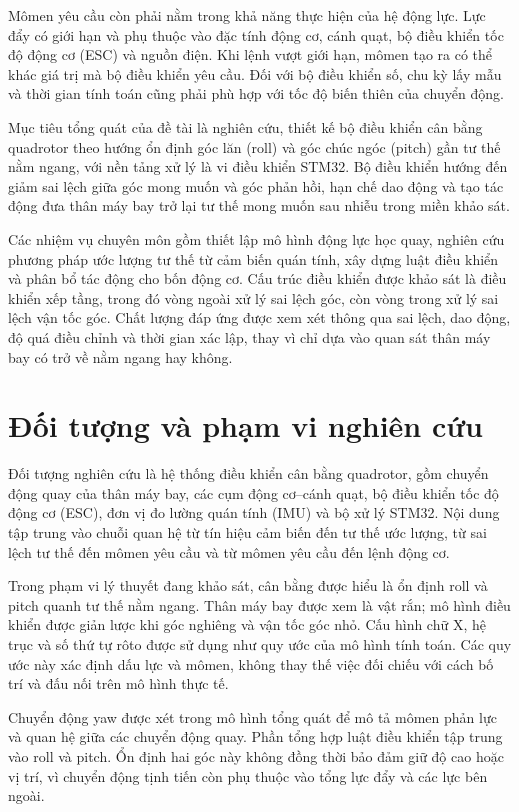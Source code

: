 Mômen yêu cầu còn phải nằm trong khả năng thực hiện của hệ động lực. Lực đẩy có giới hạn và phụ thuộc vào đặc tính động cơ, cánh quạt, bộ điều khiển tốc độ động cơ (ESC) và nguồn điện. Khi lệnh vượt giới hạn, mômen tạo ra có thể khác giá trị mà bộ điều khiển yêu cầu. Đối với bộ điều khiển số, chu kỳ lấy mẫu và thời gian tính toán cũng phải phù hợp với tốc độ biến thiên của chuyển động.

Mục tiêu tổng quát của đề tài là nghiên cứu, thiết kế bộ điều khiển cân bằng quadrotor theo hướng ổn định góc lăn (roll) và góc chúc ngóc (pitch) gần tư thế nằm ngang, với nền tảng xử lý là vi điều khiển STM32. Bộ điều khiển hướng đến giảm sai lệch giữa góc mong muốn và góc phản hồi, hạn chế dao động và tạo tác động đưa thân máy bay trở lại tư thế mong muốn sau nhiễu trong miền khảo sát.

Các nhiệm vụ chuyên môn gồm thiết lập mô hình động lực học quay, nghiên cứu phương pháp ước lượng tư thế từ cảm biến quán tính, xây dựng luật điều khiển và phân bổ tác động cho bốn động cơ. Cấu trúc điều khiển được khảo sát là điều khiển xếp tầng, trong đó vòng ngoài xử lý sai lệch góc, còn vòng trong xử lý sai lệch vận tốc góc. Chất lượng đáp ứng được xem xét thông qua sai lệch, dao động, độ quá điều chỉnh và thời gian xác lập, thay vì chỉ dựa vào quan sát thân máy bay có trở về nằm ngang hay không.

\section{Đối tượng và phạm vi nghiên cứu}
\label{sec:introduction-scope}

Đối tượng nghiên cứu là hệ thống điều khiển cân bằng quadrotor, gồm chuyển động quay của thân máy bay, các cụm động cơ--cánh quạt, bộ điều khiển tốc độ động cơ (ESC), đơn vị đo lường quán tính (IMU) và bộ xử lý STM32. Nội dung tập trung vào chuỗi quan hệ từ tín hiệu cảm biến đến tư thế ước lượng, từ sai lệch tư thế đến mômen yêu cầu và từ mômen yêu cầu đến lệnh động cơ.

Trong phạm vi lý thuyết đang khảo sát, cân bằng được hiểu là ổn định roll và pitch quanh tư thế nằm ngang. Thân máy bay được xem là vật rắn; mô hình điều khiển được giản lược khi góc nghiêng và vận tốc góc nhỏ. Cấu hình chữ X, hệ trục và số thứ tự rôto được sử dụng như quy ước của mô hình tính toán. Các quy ước này xác định dấu lực và mômen, không thay thế việc đối chiếu với cách bố trí và đấu nối trên mô hình thực tế.

Chuyển động yaw được xét trong mô hình tổng quát để mô tả mômen phản lực và quan hệ giữa các chuyển động quay. Phần tổng hợp luật điều khiển tập trung vào roll và pitch. Ổn định hai góc này không đồng thời bảo đảm giữ độ cao hoặc vị trí, vì chuyển động tịnh tiến còn phụ thuộc vào tổng lực đẩy và các lực bên ngoài.

